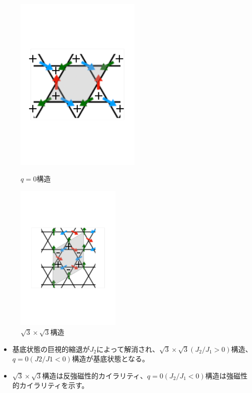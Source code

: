 \documentclass[12pt,titlepage,dvipdfmx]{jarticle}
\begin{document}
\begin{figure}[tbh]
   \begin{minipage}{0.5\hsize}
    \begin{center}
     \includegraphics[width=6cm]{figure/q0.pdf}
    \end{center}
    \caption{$q=0$構造}
    \label{fig:one}
   \end{minipage}
   \begin{minipage}{0.5\hsize}
    \begin{center}
     \includegraphics[width=5cm]{figure/sqrt3.pdf}
    \end{center}
    \caption{$\sqrt{3}\times\sqrt{3}$構造}
    \label{fig:two}
   \end{minipage}
  \end{figure}
\begin{itemize}
   \item 基底状態の巨視的縮退が$J_2$によって解消され、$\sqrt{3}\times\sqrt{3}(J_2/J_1>0)$構造、$q=0(J2/J1<0)$構造が基底状態となる。
   \item $\sqrt{3}\times\sqrt{3}$構造は反強磁性的カイラリティ、$q=0(J_2/J_1<0)$構造は強磁性的カイラリティを示す。
\end{itemize}
\end{document}
